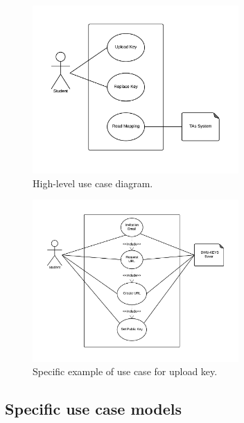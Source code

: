 \documentclass[11pt,a4paper]{report}
\begin{document}
\begin{figure}[H]
    \centering
    \includegraphics[width=0.7\textwidth]{pictures/use_case_pksu_del2_b_high}
    \caption{High-level use case diagram.}
    \label{fig:use_case_diagram_high_level}
\end{figure}



\begin{figure}[H]
    \centering
    \includegraphics[width=0.7\textwidth]{pictures/use_case_pksu_del2_b_example}
    \caption{Specific example of use case for upload key.}
    \label{fig:use_case_diagram_example}
\end{figure}

\subsection{Specific use case models}\label{subsec:Specific_Use_case_model}
\end{document}
